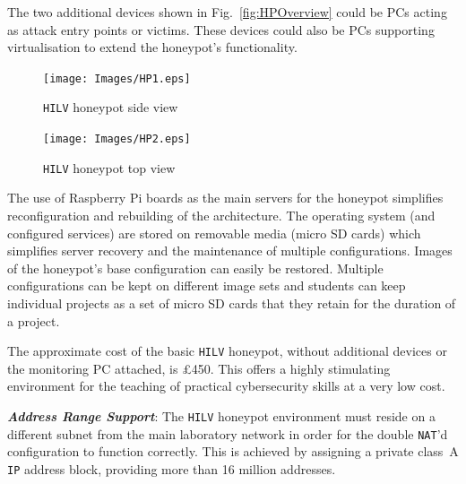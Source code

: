 \documentclass[10pt,journal]{IEEEtran}
\begin{document}
The two additional devices shown in Fig.~\ref{fig:HPOverview} could be PCs
acting as attack entry points or victims. These devices could also be PCs
supporting virtualisation to extend the honeypot's functionality.

\begin{figure}[ht]
  \centering
  \begin{minipage}[h]{0.45\textwidth}
    \texttt{[image: Images/HP1.eps]}
    \caption{\texttt{HILV} honeypot side view\label{fig:HP1}}
  \end{minipage}
  \hfill
  \begin{minipage}[h]{0.45\textwidth}
    \texttt{[image: Images/HP2.eps]}
    \caption{\texttt{HILV} honeypot top view\label{fig:HP2}}
  \end{minipage}
\end{figure}


The use of Raspberry Pi boards as the main servers for the honeypot simplifies
reconfiguration and rebuilding of the architecture.  The operating system (and
configured services) are stored on removable media (micro SD cards) which
simplifies server recovery and the maintenance of multiple configurations.
Images of the honeypot's base configuration can easily be restored. Multiple
configurations can be kept on different image sets and students can keep
individual projects as a set of micro SD cards that they retain for the
duration of a project.

The approximate cost of the basic \texttt{HILV} honeypot, without additional
devices or the monitoring PC attached, is \pounds450.  This offers a highly
stimulating environment for the teaching of practical cybersecurity skills at a
very low cost.
\newline

\noindent\textit{\textbf{Address Range Support}}:
The \texttt{HILV} honeypot environment must reside on a different subnet from
the main laboratory network in order for the double \texttt{NAT}'d
configuration to function correctly. This is achieved by assigning a private
class~A \texttt{IP} address block, providing more than 16 million addresses.
\newline\newline
\end{document}
